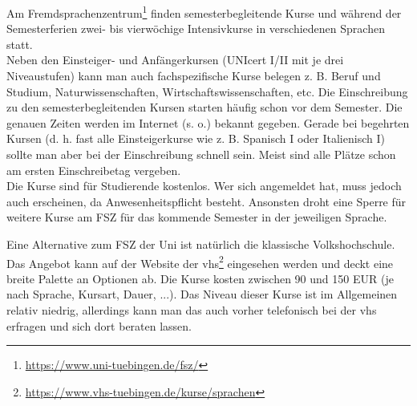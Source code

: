 Am Fremdsprachenzentrum\footnote{\url{https://www.uni-tuebingen.de/fsz/}} finden semesterbegleitende Kurse und während der Semesterferien zwei- bis vierwöchige Intensivkurse in verschiedenen Sprachen statt.\\
Neben den Einsteiger- und Anfängerkursen (UNIcert I/II mit je drei Niveaustufen) kann man auch fachspezifische Kurse belegen z. B. Beruf und Studium, Naturwissenschaften, Wirtschaftswissenschaften, etc.  
Die Einschreibung zu den semesterbegleitenden Kursen starten häufig schon vor dem Semester. Die genauen Zeiten werden im Internet (s. o.) bekannt gegeben.  Gerade bei begehrten Kursen (d. h. fast alle Einsteigerkurse wie z. B. Spanisch I oder Italienisch I) sollte man aber bei der  Einschreibung schnell sein. Meist sind alle Plätze schon am ersten Einschreibetag vergeben.\\
Die Kurse sind für Studierende kostenlos. Wer sich angemeldet hat, muss jedoch auch erscheinen, da Anwesenheitspflicht besteht. Ansonsten droht eine Sperre für weitere Kurse am FSZ für das kommende Semester in der jeweiligen Sprache.
  
Eine Alternative zum FSZ der Uni ist natürlich die klassische Volkshochschule. Das Angebot kann auf der Website der vhs\footnote{\url{https://www.vhs-tuebingen.de/kurse/sprachen}} eingesehen werden und deckt eine breite Palette an Optionen ab. 
Die Kurse kosten zwischen 90 und 150 EUR (je nach Sprache, Kursart, Dauer, ...). Das Niveau dieser Kurse ist im Allgemeinen relativ niedrig, allerdings kann man das auch vorher telefonisch bei der vhs erfragen und sich dort beraten lassen.

